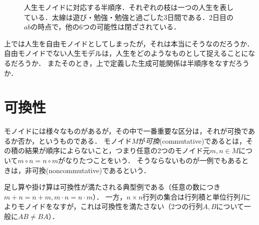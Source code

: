 \documentclass[11pt,a4paper, dvipdfmx]{jsarticle}
\begin{document}
\begin{figure}[h]
    \centering
      \caption{人生モノイドに対応する半順序．それぞれの枝は一つの人生を表している．太線は遊び・勉強・勉強と過ごした3日間である．2日目の$ab$の時点で，他の6つの可能性は閉ざされている．}
      \label{fig:monoid_tree}
\end{figure}

\begin{exercise}
    上では人生を自由モノイドとしてしまったが，それは本当にそうなのだろうか．
    自由モノイドでない人生モデルは，人生をどのようなものとして捉えることになるだろうか．
    またそのとき，上で定義した生成可能関係は半順序をなすだろうか．
\end{exercise}    


\section{可換性}
モノイドには様々なものがあるが，その中で一番重要な区分は，それが可換であるか否か，というものである．
モノイド$M$が\emph{可換}(commutative)であるとは，その積の結果が順序によらないこと，つまり任意の2つのモノイド元$m,n \in M$について$m \circ n = n \circ m$がなりたつことをいう．
そうならないものが一例でもあるときは，非可換(noncommutative)であるという．

\begin{example}
    足し算や掛け算は可換性が満たされる典型例である（任意の数につき$m+n = n+m, m\cdot n = n\cdot m$）．
    一方，$n \times n$行列の集合は行列積と単位行列$I$によりモノイドをなすが，これは可換性を満たさない（2つの行列$A, B$について一般に$AB \neq BA$）．
\end{example}
\end{document}
